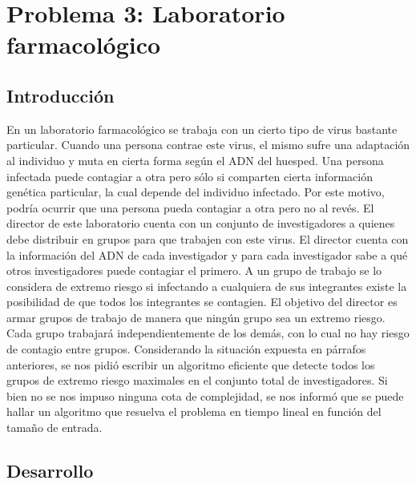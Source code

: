\section{Problema 3: Laboratorio farmacol\'ogico}

\subsection{Introducci\'on}

\quad En un laboratorio farmacológico se trabaja con un cierto tipo de virus bastante particular. Cuando una persona contrae este virus, el mismo sufre una adaptación al individuo y muta en cierta forma según el ADN del huesped. Una persona infectada puede contagiar a otra pero sólo si comparten cierta información genética particular, la cual depende del individuo infectado. Por este motivo, podría ocurrir que una persona pueda contagiar a otra pero no al revés.
\quad El director de este laboratorio cuenta con un conjunto de investigadores a quienes debe distribuir en grupos para que trabajen con este virus. El director cuenta con la información del ADN de cada investigador y para cada investigador sabe a qué otros investigadores puede contagiar el primero. A un grupo de trabajo se lo considera de extremo riesgo si infectando a cualquiera de sus integrantes existe la posibilidad de que todos los integrantes se contagien. El objetivo del director es armar grupos de trabajo de manera que ningún grupo sea un extremo riesgo. Cada grupo trabajará independientemente de los demás, con lo cual no hay riesgo de contagio entre grupos.
\quad Considerando la situación expuesta en párrafos anteriores, se nos pidió escribir un algoritmo eficiente que detecte todos los grupos de extremo riesgo maximales en el conjunto total de investigadores. Si bien no se nos impuso ninguna cota de complejidad, se nos informó que se puede hallar un algoritmo que resuelva el problema en tiempo lineal en función del tamaño de entrada.


\subsection{Desarrollo}

